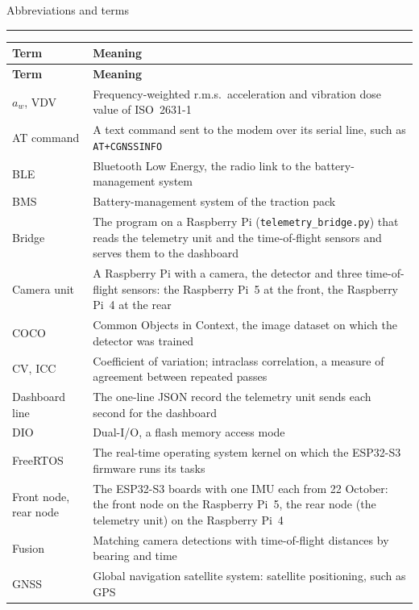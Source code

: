 \documentclass[a4paper,11pt]{report}
\begin{document}
{\newpage
{\Large Abbreviations and terms}\\
\hrule
{}

{\small
\begin{longtable}{|>{\raggedright\arraybackslash}p{2.6cm}|>{\raggedright\arraybackslash}p{11.2cm}|}
\hline
\textbf{Term} & \textbf{Meaning} \\ \hline
\endfirsthead
\hline
\textbf{Term} & \textbf{Meaning} \\ \hline
\endhead
$a_w$, VDV & Frequency-weighted r.m.s.\ acceleration and vibration dose value of ISO~2631-1 \\ \hline
AT command & A text command sent to the modem over its serial line, such as \texttt{AT+CGNSSINFO} \\ \hline
BLE & Bluetooth Low Energy, the radio link to the battery-management system \\ \hline
BMS & Battery-management system of the traction pack \\ \hline
Bridge & The program on a Raspberry Pi (\texttt{telemetry\_bridge.py}) that reads the telemetry unit and the time-of-flight sensors and serves them to the dashboard \\ \hline
Camera unit & A Raspberry Pi with a camera, the detector and three time-of-flight sensors: the Raspberry Pi~5 at the front, the Raspberry Pi~4 at the rear \\ \hline
COCO & Common Objects in Context, the image dataset on which the detector was trained \\ \hline
CV, ICC & Coefficient of variation; intraclass correlation, a measure of agreement between repeated passes \\ \hline
Dashboard line & The one-line JSON record the telemetry unit sends each second for the dashboard \\ \hline
DIO & Dual-I/O, a flash memory access mode \\ \hline
FreeRTOS & The real-time operating system kernel on which the ESP32-S3 firmware runs its tasks \\ \hline
Front node, rear node & The ESP32-S3 boards with one IMU each from 22 October: the front node on the Raspberry Pi~5, the rear node (the telemetry unit) on the Raspberry Pi~4 \\ \hline
Fusion & Matching camera detections with time-of-flight distances by bearing and time \\ \hline
GNSS & Global navigation satellite system: satellite positioning, such as GPS \\ \hline

\end{longtable}}}
\end{document}
